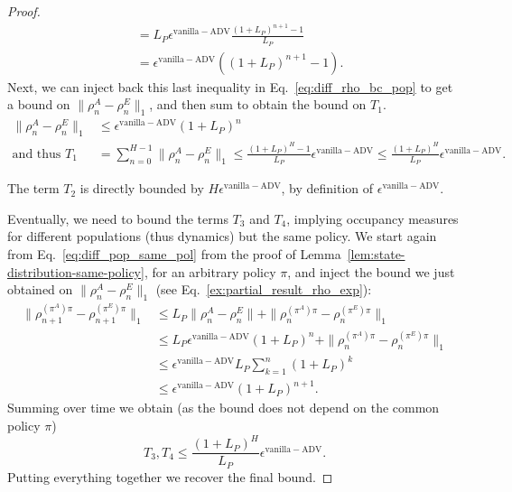 \documentclass{article}
\begin{document}
\begin{proof}
\begin{align}
    &= L_P\epsilon^{\mathrm{vanilla-ADV}} \frac{(1+L_P)^{n+1}-1}{L_P}
    \\
    &= \epsilon^{\mathrm{vanilla-ADV}}( (1+L_P)^{n+1} -1).
\end{align}
Next, we can inject back this last inequality in Eq.~\eqref{eq:diff_rho_bc_pop} to get a bound on $\|\rho_n^A - \rho_n^E\|_1$, and then sum to obtain the bound on $T_1$.
\begin{align}
    \|\rho_n^A - \rho_n^E\|_1 &\leq \epsilon^{\mathrm{vanilla-ADV}} (1+ L_P)^n
    \label{ex:partial_result_rho_exp}
    \\ \text{and thus }
    T_1 &= \sum_{n=0}^{H-1} \|\rho_n^A - \rho_n^E\|_1 \leq \frac{(1+L_P)^H - 1}{L_P}\epsilon^{\mathrm{vanilla-ADV}}
    \leq \frac{(1+L_P)^H}{L_P}\epsilon^{\mathrm{vanilla-ADV}}.
\end{align}

The term $T_2$ is directly bounded by $H \epsilon^{\mathrm{vanilla-ADV}}$, by definition of $\epsilon^{\mathrm{vanilla-ADV}}$. 

%
Eventually, we need to bound the terms $T_3$ and $T_4$, implying occupancy measures for different populations (thus dynamics) but the same policy. We start again from Eq.~\eqref{eq:diff_pop_same_pol} from the proof of Lemma~\ref{lem:state-distribution-same-policy}, for an arbitrary policy $\pi$, and inject the bound we just obtained on $\|\rho_n^A - \rho_n^E\|_1$ (see Eq.~\eqref{ex:partial_result_rho_exp}):
\begin{align}
    \|\rho_{n+1}^{(\pi^A)\pi} - \rho_{n+1}^{(\pi^E)\pi}\|_1 &\leq L_P\|\rho_n^A - \rho_n^E\| + \|\rho_n^{(\pi^A)\pi} - \rho_n^{(\pi^E)\pi}\|_1
    \\
    &\leq L_P \epsilon^{\mathrm{vanilla-ADV}} (1+L_P)^n +  \|\rho_n^{(\pi^A)\pi} - \rho_n^{(\pi^E)\pi}\|_1
    \\
    &\leq \epsilon^{\mathrm{vanilla-ADV}} L_P \sum_{k=1}^n (1+L_P)^k
    \\
    &\leq \epsilon^{\mathrm{vanilla-ADV}} (1+L_P)^{n+1}.
\end{align}
Summing over time we obtain (as the bound does not depend on the common policy $\pi$)
\begin{equation}
    T_3, T_4 \leq \frac{(1+L_P)^H}{L_P}\epsilon^{\mathrm{vanilla-ADV}}.
\end{equation}
Putting everything together we recover the final bound.
\end{proof}
\end{document}
